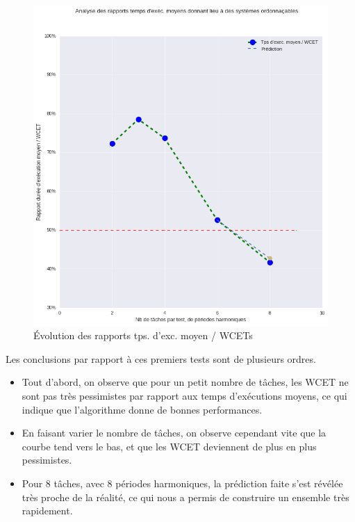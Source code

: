 	\begin{center}
		\label{wcetevo}
		\begin{figure}[H]
			\caption{Évolution des rapports tps. d'exc. moyen / WCETs}
			\includegraphics[scale=0.6]{img/wcet/wcetstudy}
		\end{figure}
	\end{center}
	
	Les conclusions par rapport à ces premiers tests sont de plusieurs ordres. 
	\begin{itemize}
		\item Tout d'abord, on observe que pour un petit nombre de tâches, les WCET ne sont pas très pessimistes par rapport aux temps d'exécutions moyens, 
		ce qui indique que l'algorithme donne de bonnes performances.
		\item En faisant varier le nombre de tâches, on observe cependant vite que la courbe tend vers le bas, et que les WCET deviennent 
		de plus en plus pessimistes.
		\item Pour 8 tâches, avec 8 périodes harmoniques, la prédiction faite s'est révélée très proche de la réalité, 
		ce qui nous a permis de construire un ensemble très rapidement.
	\end{itemize}

